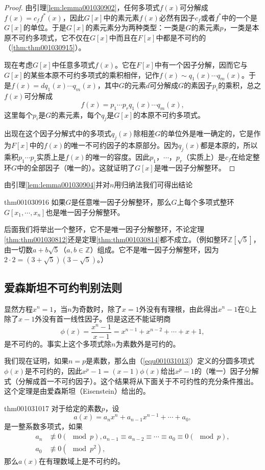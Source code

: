 \begin{proof}
由引理\ref{lem:lemma001030902}，任何多项式$f(x)$可分解成$f(x)=c_ff^*(x)$，因此$G[x]$中的素元素$f(x)$必然有因子$c_f$或者$f^*$中的一个是$G[x]$的单位。于是$G[x]$的素元素分为两种类型：一类是$G$的素元素$p$，一类是本原不可约多项式，它不仅在$G[x]$中而且在$F[x]$中都是不可约的（\ref{thm:thm001030915}）。

现在考虑$G[x]$中任意多项式$f(x)$。它在$F[x]$中有一个因子分解，因而它与$G[x]$的某些本原不可约多项式的乘积相伴，记作$f(x)\sim q_1(x)\cdots q_m(x)$。于是$f(x)=dq_1(x)\cdots q_m(x)$，其中$G$的元素$d$可分解成$G$的素因子$p_i$的乘积，总之$f(x)$可分解成
\[
f(x)=p_1 \cdots p_rq_1(x)\cdots q_m(x),
\]
这里每个$p_i$是$G$的素元素，每个$q_j$是$G[x]$的本原不可约多项式。

出现在这个因子分解式中的多项式$q_j(x)$除相差$G$的单位外是唯一确定的，它是作为$F[x]$中的$f(x)$的唯一不可约因子的本原部分。因为$q_j(x)$都是本原的，所以乘积$p_1 \cdots p_r$实质上是$f(x)$的唯一的容度。因此$p_1$，$\cdots$，$p_r$（实质上）是$c_f$在给定整环$G$中的全部因子（唯一的）。这就证明了$G[x]$是唯一因子分解整环。
\end{proof}

由引理\ref{lem:lemma001030904}并对$n$用归纳法我们可得出结论
\begin{theorem}{}{thm001030916}
如果$G$是任意唯一因子分解整环，那么$G$上每个多项式整环$G[x_1, \cdots, x_n]$也是唯一因子分解整环。
\end{theorem}

后面我们将举出一个整环，它不是唯一因子分解整环，不论定理\ref{thm:thm001030812}还是定理\ref{thm:thm001030814}都不成立。（例如整环$\mathbb{Z}[\sqrt{5}]$，由一切数$a+b\sqrt{5}$（$a,b \in \mathbb{Z}$）组成。它不是唯一因子分解整环，因为$2 \cdot 2 = (3+\sqrt{5})(3-\sqrt{5})$。）



\subsection{爱森斯坦不可约判别法则}\label{subsection0010310}
显然方程$x^n=1$，当$n$为奇数时，除了$x=1$外没有有理根，由此得出$x^n-1$在$\mathbb{Q}$上除了$x-1$外没有首一线性因子。但是这还不能证明商
\begin{equation}\label{equ001031013}
\phi(x)=\frac{x^n-1}{x-1}=x^{n-1}+x^{n-2}+\cdots +x+1,
\end{equation}
是不可约的。事实上这个多项式除$n$为素数外是可约的。

我们现在证明，如果$n=p$是素数，那么由（\ref{equ001031013}）定义的分圆多项式$\phi(x)$是不可约的，因此$x^p-1=(x-1)\phi(x)$给出$x^p-1$的（唯一）因子分解式（分解成首一不可约因子）。这个结果将从下面关于不可约性的充分条件推出。这个定理是由爱森斯坦（Eisenstein）给出的。
\begin{theorem}{}{thm001031017}
对于给定的素数$p$，设
\[
a(x)=a_nx^n+a_{n-1}x^{n-1}+\cdots+a_0,
\]
是一整系数多项式，如果
\[
\begin{aligned}
a_n &\not\equiv 0(\mod{p}),a_{n-1}\equiv a_{n-2}\equiv \cdots \equiv a_0 \equiv 0(\mod{p}),\\
a_0 &\not\equiv 0(\mod{p^2}),
\end{aligned}
\]
那么$a(x)$在有理数域上是不可约的。
\end{theorem}

